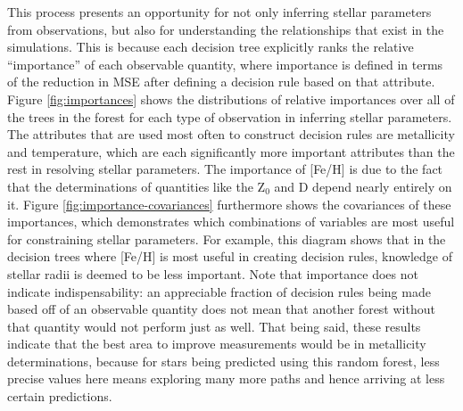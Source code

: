 \documentclass[twocolumn,twocolappendix]{aastex6}
\begin{document}
This process presents an opportunity for not only inferring stellar parameters from observations, but also for understanding the relationships that exist in the simulations. This is because each decision tree explicitly ranks the relative ``importance'' of each observable quantity, where importance is defined in terms of the reduction in MSE after defining a decision rule based on that attribute. Figure \ref{fig:importances} shows the distributions of relative importances over all of the trees in the forest for each type of observation in inferring stellar parameters. The attributes that are used most often to construct decision rules are metallicity and temperature, which are each significantly more important attributes than the rest in resolving stellar parameters. The importance of [Fe/H] is due to the fact that the determinations of quantities like the Z$_0$ and D depend nearly entirely on it. Figure \ref{fig:importance-covariances} furthermore shows the covariances of these importances, which demonstrates which combinations of variables are most useful for constraining stellar parameters. For example, this diagram shows that in the decision trees where [Fe/H] is most useful in creating decision rules, knowledge of stellar radii is deemed to be less important. Note that importance does not indicate indispensability: an appreciable fraction of decision rules being made based off of an observable quantity does not mean that another forest without that quantity would not perform just as well. That being said, these results indicate that the best area to improve measurements would be in metallicity determinations, because for stars being predicted using this random forest, less precise values here means exploring many more paths and hence arriving at less certain predictions. %
\end{document}

